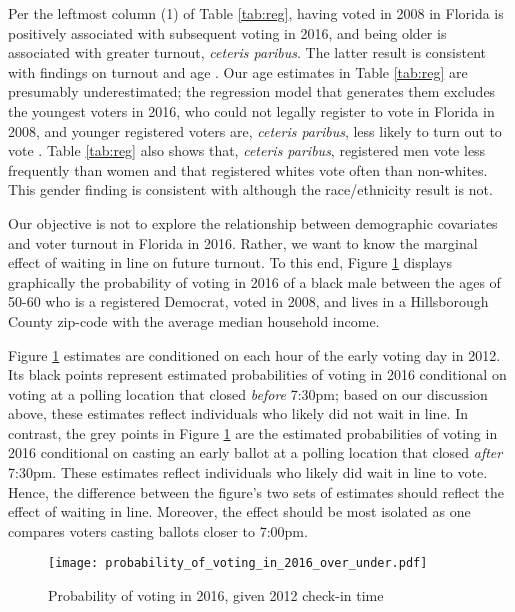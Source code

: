 \documentclass[12pt,titlepage]{article}
\begin{document}
Per the leftmost column (1) of Table \ref{tab:reg}, having voted in
2008 in Florida is positively associated with subsequent voting in
2016, and being older is associated with greater turnout,
\emph{ceteris paribus}.  The latter result is consistent with findings
on turnout and age \citep{costaetal:walkingthewalk}.  Our age
estimates in Table \ref{tab:reg} are presumably underestimated; the
regression model that generates them excludes the youngest voters in
2016, who could not legally register to vote in Florida in 2008, and
younger registered voters are, \emph{ceteris paribus}, less likely to
turn out to vote \citep{shinosmith:registrationtiming}.  Table
\ref{tab:reg} also shows that, \emph{ceteris paribus}, registered men
vote less frequently than women and that registered whites vote often
than non-whites.  This gender finding is consistent with
\citet{leighleynagler:whovotesnow} although the race/ethnicity result
is not.

Our objective is not to explore the relationship between demographic
covariates and voter turnout in Florida in 2016.  Rather, we want to
know the marginal effect of waiting in line on future turnout.  To
this end, Figure \ref{fig:prvoting2016} displays graphically the
probability of voting in 2016 of a black male between the ages of
50-60 who is a registered Democrat, voted in 2008, and lives in a
Hillsborough County zip-code with the average median household income.

Figure \ref{fig:prvoting2016} estimates are conditioned on each hour
of the early voting day in 2012. Its black points represent estimated
probabilities of voting in 2016 conditional on voting at a polling
location that closed \emph{before} 7:30pm; based on our discussion
above, these estimates reflect individuals who likely did not wait in
line.  In contrast, the grey points in Figure \ref{fig:prvoting2016}
are the estimated probabilities of voting in 2016 conditional on
casting an early ballot at a polling location that closed \emph{after}
7:30pm.  These estimates reflect individuals who likely did wait in
line to vote.  Hence, the difference between the figure's two sets of
estimates should reflect the effect of waiting in line.  Moreover, the
effect should be most isolated as one compares voters casting ballots
closer to 7:00pm.

\begin{figure}[!ht]
\caption{Probability of voting in 2016, given 2012 check-in time}
  \label{fig:prvoting2016}
  \centering
    \centering\texttt{[image: probability\_of\_voting\_in\_2016\_over\_under.pdf]}
\end{figure}
\end{document}
